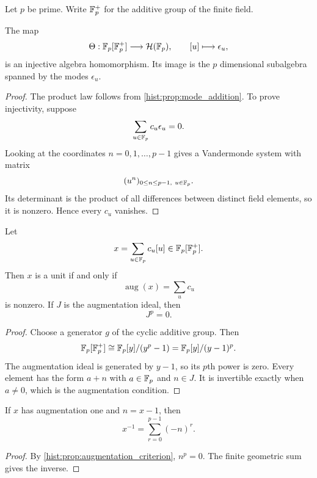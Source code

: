 Let \(p\) be prime. Write \(\mathbb F_p^+\) for the additive group of the finite field.

\begin{histtheorem}\label{hist:thm:mode_group_algebra}
The map
\[
\Theta:
\mathbb F_p[\mathbb F_p^+]
\longrightarrow
\mathcal H(\mathbb F_p),
\qquad
[u]\longmapsto\epsilon_u,
\]
is an injective algebra homomorphism. Its image is the \(p\) dimensional subalgebra spanned by the modes \(\epsilon_u\).
\end{histtheorem}

\begin{proof}
The product law follows from \cref{hist:prop:mode_addition}. To prove injectivity, suppose
\[
\sum_{u\in\mathbb F_p}c_u\epsilon_u=0.
\]
Looking at the coordinates \(n=0,1,\ldots,p-1\) gives a Vandermonde system with matrix
\[
(u^n)_{0\leq n\leq p-1,\ u\in\mathbb F_p}.
\]
Its determinant is the product of all differences between distinct field elements, so it is nonzero. Hence every \(c_u\) vanishes.
\end{proof}

\begin{histproposition}\label{hist:prop:augmentation_criterion}
Let
\[
x=\sum_{u\in\mathbb F_p}c_u[u]
\in
\mathbb F_p[\mathbb F_p^+].
\]
Then \(x\) is a unit if and only if
\[
\operatorname{aug}(x)
=
\sum_uc_u
\]
is nonzero. If \(J\) is the augmentation ideal, then
\[
J^p=0.
\]
\end{histproposition}

\begin{proof}
Choose a generator \(g\) of the cyclic additive group. Then
\[
\mathbb F_p[\mathbb F_p^+]
\cong
\mathbb F_p[y]/(y^p-1)
=
\mathbb F_p[y]/(y-1)^p.
\]
The augmentation ideal is generated by \(y-1\), so its \(p\)th power is zero. Every element has the form \(a+n\) with \(a\in\mathbb F_p\) and \(n\in J\). It is invertible exactly when \(a\neq0\), which is the augmentation condition.
\end{proof}

\begin{histcorollary}\label{hist:cor:finite_inverse_formula}
If \(x\) has augmentation one and \(n=x-1\), then
\[
\boxed{
x^{-1}
=
\sum_{r=0}^{p-1}(-n)^r.
}
\]
\end{histcorollary}

\begin{proof}
By \cref{hist:prop:augmentation_criterion}, \(n^p=0\). The finite geometric sum gives the inverse.
\end{proof}

